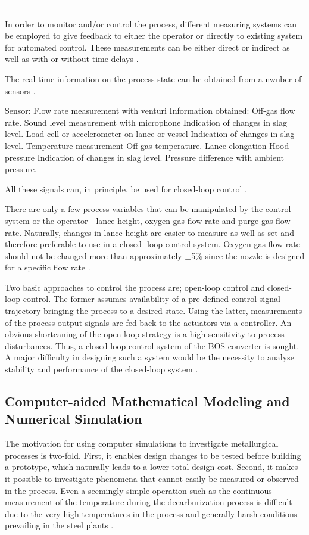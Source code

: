 ---------------------------------------

In order to monitor and/or control the process, different measuring systems can be employed to give feedback to either the operator or directly to existing system for automated control. These measurements can be either direct or indirect as well as with or without time delays \citep{Widlund1998}.

The real-time information on the process state can be obtained from a nwnber of sensors \citep{Widlund1998}.

Sensor: Flow rate measurement with venturi
Information obtained: Off-gas flow rate.
Sound level measurement with microphone
Indication of changes in slag level.
Load cell or accelerometer on lance or vessel
Indication of changes in slag level.
Temperature measurement Off-gas temperature. Lance elongation Hood pressure
Indication of changes in slag level. Pressure difference with ambient pressure.

All these signals can, in principle, be used for closed-loop control \citep{Widlund1998}.

There are only a few process variables that can be manipulated by the control system or the operator - lance height, oxygen gas flow rate and purge gas flow rate. Naturally, changes in lance height are easier to measure as well as set and therefore preferable to use in a closed- loop control system. Oxygen gas flow rate should not be changed more than approximately $\pm$5\% since the nozzle is designed for a specific flow rate \citep{Widlund1998}.

Two basic approaches to control the process are; open-loop control and closed-loop control. The former assumes availability of a pre-defined control signal trajectory bringing the process to a desired state. Using the latter, measurements of the process output signals are fed back to the actuators via a controller. An obvious shortcaning of the open-loop strategy is a high sensitivity to process disturbances. Thus, a closed-loop control system of the BOS converter is sought. A major difficulty in designing such a system would be the necessity to analyse stability and performance of the closed-loop system \citep{Widlund1998}.

\subsection{Computer-aided Mathematical Modeling and Numerical Simulation}

The motivation for using computer simulations to investigate metallurgical processes is two-fold. First, it enables design changes to be tested before building a prototype, which naturally leads to a lower total design cost. Second, it makes it possible to investigate phenomena that cannot easily be measured or observed in the process. Even a seemingly simple operation such as the continuous measurement of the temperature during the decarburization process is difficult due to the very high temperatures in the process and generally harsh conditions prevailing in the steel plants \citep{Ersson2018}.

